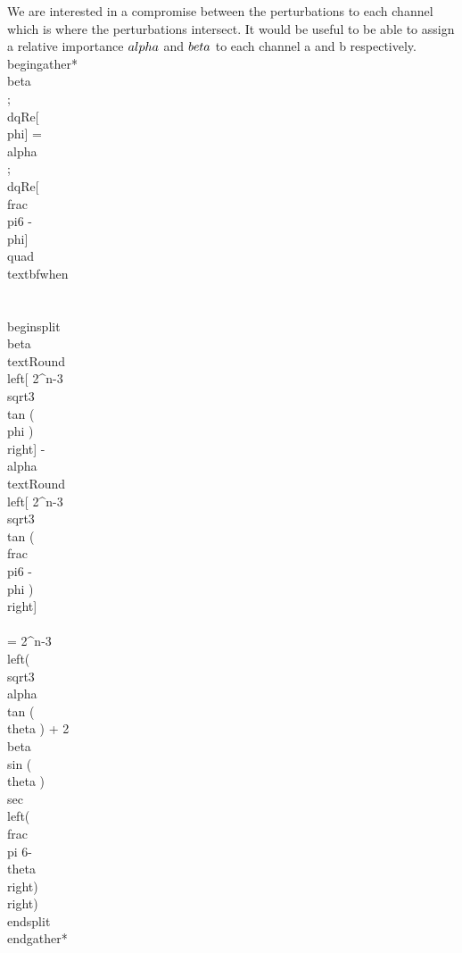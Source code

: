 We are interested in a compromise between the perturbations to each channel which is where the perturbations intersect. It would be useful to be able to assign a relative importance $\\alpha$ and $\\beta$ to each channel a and b respectively. 
\\begin{gather*}
\\beta \\; \\dqRe[\\phi] = \\alpha \\; \\dqRe[\\frac{\\pi}{6} -\\phi]  \\quad \\textbf{when} \\\\
\\begin{split}
\\beta \\text{Round}\\left[ 2^{n-3}\\sqrt{3} \\tan (\\phi ) \\right] - \\alpha \\text{Round}\\left[ 2^{n-3}\\sqrt{3} \\tan (\\frac{\\pi}{6} - \\phi ) \\right] \\\\
=   2^{n-3} \\left(\\sqrt{3} \\alpha  \\tan (\\theta ) + 2 \\beta  \\sin (\\theta ) \\sec \\left(\\frac{\\pi }{6}-\\theta \\right)\\right)
\\end{split}
\\end{gather*}

